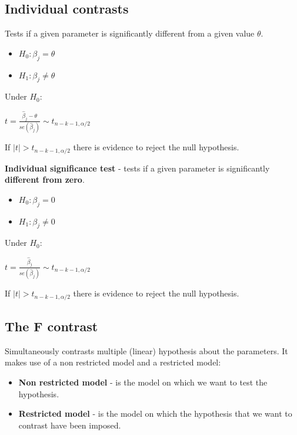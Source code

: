 \documentclass[10pt, a4paper, landscape]{extarticle}
\begin{document}
\begin{multicols}{3}
\subsection*{Individual contrasts}

Tests if a given parameter is significantly different from a given value $\theta$.

\begin{itemize}[leftmargin=*]
\item $H_0: \beta_j = \theta$
\item $H_1: \beta_j \neq \theta$
\end{itemize}

Under $H_0$:

\begin{center}
$t = \frac{\hat{\beta}_j - \theta}{se(\hat{\beta}_j)} \sim t_{n-k-1, \alpha/2}$
\end{center}

If $\mid t \mid > t_{n-k-1, \alpha/2}$ there is evidence to reject the null hypothesis.

\textbf{Individual significance test} - tests if a given parameter is significantly \textbf{different from zero}.

\begin{itemize}[leftmargin=*]
\item $H_0: \beta_j = 0$
\item $H_1: \beta_j \neq 0$
\end{itemize}

Under $H_0$:

\begin{center}
$t = \frac{\hat{\beta}_j}{se(\hat{\beta}_j)} \sim t_{n-k-1, \alpha/2}$
\end{center}

If $\mid t \mid > t_{n-k-1, \alpha/2}$ there is evidence to reject the null hypothesis.

\subsection*{The F contrast}

Simultaneously contrasts multiple (linear) hypothesis about the parameters. It makes use of a non restricted model and a restricted model:

\begin{itemize}[leftmargin=*]
\item \textbf{Non restricted model} - is the model on which we want to test the hypothesis.
\item \textbf{Restricted model} - is the model on which the hypothesis that we want to contrast have been imposed.
\end{itemize}


\end{multicols}
\end{document}
